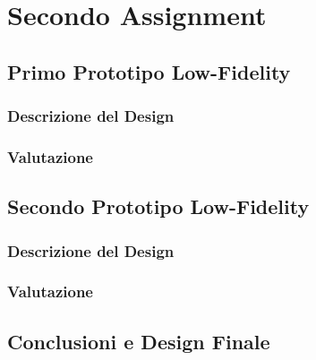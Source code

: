 

\section{Secondo Assignment}

\subsection{Primo Prototipo Low-Fidelity}
\subsubsection{Descrizione del Design}
\subsubsection{Valutazione}

\subsection{Secondo Prototipo Low-Fidelity}
\subsubsection{Descrizione del Design}
\subsubsection{Valutazione}

\subsection{Conclusioni e Design Finale}
